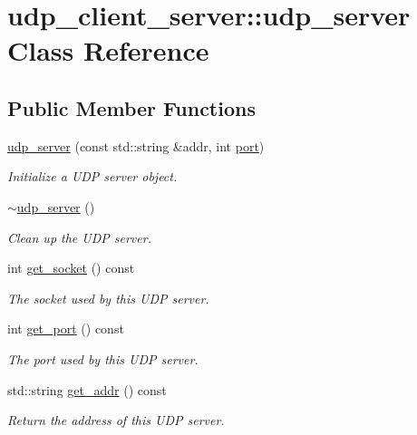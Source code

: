 \hypertarget{classudp__client__server_1_1udp__server}{}\section{udp\+\_\+client\+\_\+server\+:\+:udp\+\_\+server Class Reference}
\label{classudp__client__server_1_1udp__server}
\subsection*{Public Member Functions}
\begin{DoxyCompactItemize}
\item 
\hyperlink{classudp__client__server_1_1udp__server_ae44891f41370ca856da0fe50923a1b25}{udp\+\_\+server} (const std\+::string \&addr, int \hyperlink{rollo__comm_8cpp_a63c89c04d1feae07ca35558055155ffb}{port})
\begin{DoxyCompactList}\small\item\em Initialize a U\+D\+P server object. \end{DoxyCompactList}\item 
\hyperlink{classudp__client__server_1_1udp__server_acdce04ccdcc420d4f959110c75ec9b1c}{$\sim$udp\+\_\+server} ()
\begin{DoxyCompactList}\small\item\em Clean up the U\+D\+P server. \end{DoxyCompactList}\item 
int \hyperlink{classudp__client__server_1_1udp__server_ace51743964b568c021b0f3154f4c0306}{get\+\_\+socket} () const 
\begin{DoxyCompactList}\small\item\em The socket used by this U\+D\+P server. \end{DoxyCompactList}\item 
int \hyperlink{classudp__client__server_1_1udp__server_a78b6867c5dc04599c8b146fe4971459a}{get\+\_\+port} () const 
\begin{DoxyCompactList}\small\item\em The port used by this U\+D\+P server. \end{DoxyCompactList}\item 
std\+::string \hyperlink{classudp__client__server_1_1udp__server_a9b82191caf4ccc1d6822d5f92e382e02}{get\+\_\+addr} () const 
\begin{DoxyCompactList}\small\item\em Return the address of this U\+D\+P server. \end{DoxyCompactList}\item 

\end{DoxyCompactItemize}
